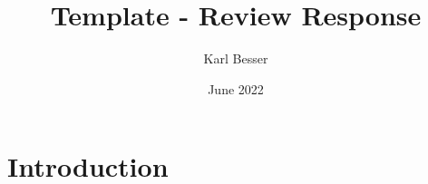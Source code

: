 \documentclass{article}
\title{Template - Review Response}
\author{Karl Besser}
\date{June 2022}
\begin{document}
\maketitle

\section{Introduction}
\end{document}
